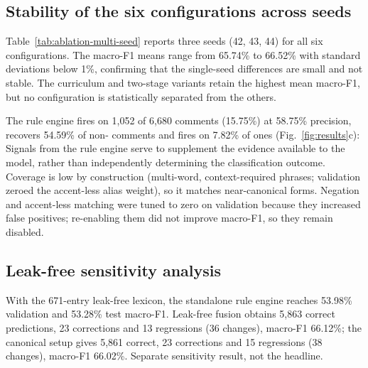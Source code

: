 \subsection{Stability of the six configurations across seeds}
\label{sec:ablation-multi-seed}

Table~\ref{tab:ablation-multi-seed} reports three seeds (42, 43, 44) for all six
configurations. The macro-F1 means range from 65.74\% to 66.52\% with standard
deviations below 1\%, confirming that the single-seed differences are small and not
stable. The curriculum and two-stage variants retain the highest mean macro-F1, but
no configuration is statistically separated from the others.

\begin{table}[ht]
\centering
\caption{Multi-seed stability of the six configurations (test macro-F1 and
accuracy, mean $\pm$ std over 3 seeds).}
\label{tab:ablation-multi-seed}

\end{table}

\label{sec:rule-channel-results}

The rule engine fires on 1{,}052 of 6{,}680 comments (15.75\%) at 58.75\% precision,
recovers 54.59\% of non-\clean{} comments and fires on 7.82\% of \clean{} ones
(Fig.~\ref{fig:results}c): Signals from the rule engine serve to supplement the evidence available to the model, rather than independently determining the classification outcome. Coverage is low by
construction (multi-word, context-required phrases; validation zeroed the accent-less
alias weight), so it matches near-canonical forms. Negation and accent-less matching
were tuned to zero on validation because they increased false positives; re-enabling
them did not improve macro-F1, so they remain disabled.

\subsection{Leak-free sensitivity analysis}

\label{sec:leak-free-sensitivity}

With the 671-entry leak-free lexicon, the standalone rule engine reaches 53.98\%
validation and 53.28\% test macro-F1. Leak-free fusion obtains 5{,}863 correct
predictions, 23 corrections and 13 regressions (36 changes), macro-F1 66.12\%; the
canonical setup gives 5{,}861 correct, 23 corrections and 15 regressions (38 changes),
macro-F1 66.02\%. Separate sensitivity result, not the headline.